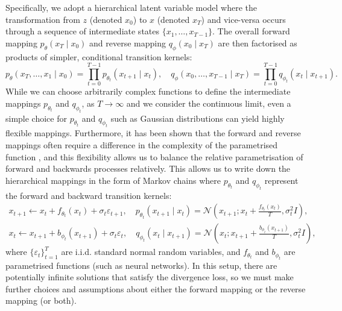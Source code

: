Specifically, we adopt a hierarchical latent variable model where the transformation from $z$ (denoted $x_0$) to $x$ (denoted $x_T$) and vice-versa occurs through a sequence of intermediate states $\{x_1, \ldots, x_{T-1}\}$. The overall forward mapping $p_\theta(x_T \mid x_0)$ and reverse mapping $q_\phi(x_0 \mid x_T)$ are then factorised as products of simpler, conditional transition kernels:
\[
    p_{\theta}(x_T, \ldots, x_1 \mid x_0) = \prod_{t=0}^{T-1} p_{\theta_{t}}(x_{t+1} \mid x_{t}), \quad q_{\phi}(x_0, \ldots, x_{T-1} \mid x_T) = \prod_{t=0}^{T-1} q_{\phi_{t}}(x_{t} \mid x_{t+1}).
\]
While we can choose arbitrarily complex functions to define the intermediate mappings $p_{\theta_t}$ and $q_{\phi_t}$\label{ntn:discrete_mappings_intermediate}, as $T \to \infty$ and we consider the continuous limit, even a simple choice for $p_{\theta_t}$ and $q_{\phi_t}$ such as Gaussian distributions can yield highly flexible mappings. Furthermore, it has been shown that the forward and reverse mappings often require a difference in the complexity of the parametrised function \cite{barber2014implicit}, and this flexibility allows us to balance the relative parametrisation of forward and backwards processes relatively. This allows us to write down the hierarchical mappings in the form of Markov chains where $p_{\theta_t}$ and $q_{\phi_t}$ represent the forward and backward transition kernels:
\begin{align}
    x_{t+1} \leftarrow x_{t} + f_{\theta_t}(x_t) + \sigma_t \varepsilon_{t+1}, \quad p_{\theta_t}(x_{t+1} \mid x_{t}) = \mathcal{N}(x_{t+1}; x_{t} + \frac{f_{\theta_t}(x_t)}{T}, \sigma_t^2 I), \\
    x_{t} \leftarrow x_{t+1} + b_{\phi_t}(x_{t+1}) + \sigma_t \varepsilon_{t}, \quad q_{\phi_t}(x_{t} \mid x_{t+1}) = \mathcal{N}(x_{t}; x_{t+1} + \frac{b_{\phi_t}(x_{t+1})}{T}, \sigma_t^2 I), \label{eq:framework_mc}
\end{align}
where $\{\varepsilon_t\}_{t=1}^{T}$ are i.i.d. standard normal random variables, and $f_{\theta_t}$ and $b_{\phi_t}$ are parametrised functions (such as neural networks)\label{ntn:param_fns}. In this setup, there are potentially infinite solutions that satisfy the divergence loss, so we must make further choices and assumptions about either the forward mapping or the reverse mapping (or both).



